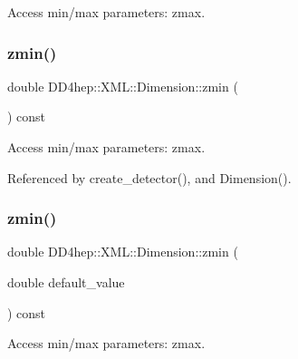 Access min/max parameters\+: zmax. 

\hypertarget{struct_d_d4hep_1_1_x_m_l_1_1_dimension_af9359e2e395f35f5903daf7e9d48e8dd}{}\label{struct_d_d4hep_1_1_x_m_l_1_1_dimension_af9359e2e395f35f5903daf7e9d48e8dd} 
\subsubsection{\texorpdfstring{zmin()}{zmin()}\hspace{0.1cm}{\footnotesize\ttfamily [1/2]}}
{\footnotesize\ttfamily double D\+D4hep\+::\+X\+M\+L\+::\+Dimension\+::zmin (\begin{DoxyParamCaption}{ }\end{DoxyParamCaption}) const}



Access min/max parameters\+: zmax. 



Referenced by create\+\_\+detector(), and Dimension().

\hypertarget{struct_d_d4hep_1_1_x_m_l_1_1_dimension_a207ec58d976189f0bcdbe1a849d58c78}{}\label{struct_d_d4hep_1_1_x_m_l_1_1_dimension_a207ec58d976189f0bcdbe1a849d58c78} 
\subsubsection{\texorpdfstring{zmin()}{zmin()}\hspace{0.1cm}{\footnotesize\ttfamily [2/2]}}
{\footnotesize\ttfamily double D\+D4hep\+::\+X\+M\+L\+::\+Dimension\+::zmin (\begin{DoxyParamCaption}\item[{double}]{default\+\_\+value }\end{DoxyParamCaption}) const}



Access min/max parameters\+: zmax. 

\hypertarget{struct_d_d4hep_1_1_x_m_l_1_1_dimension_a5f1353afd0857d09c54f73dc46b71887}{}\label{struct_d_d4hep_1_1_x_m_l_1_1_dimension_a5f1353afd0857d09c54f73dc46b71887} 
